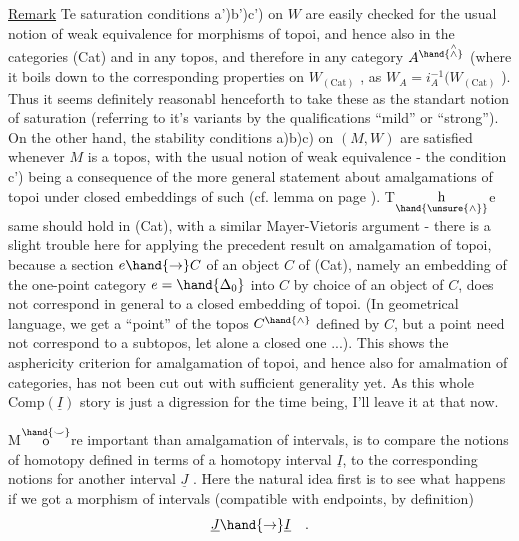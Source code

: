\uline{Remark} Te saturation conditions a')b')c') on  $W$ are easily checked
for the usual notion of weak equivalence for morphisms of topoi, and hence
also in the categories  (Cat) and in any topos, and therefore
in any category $A^{\hand{\overset{\wedge}{\wedge}}}$ (where it boils down  to the corresponding properties
on $W_{(\mathrm{Cat})}$ , as $W_A = i_A^{-1}(W_{(\mathrm{Cat})}$ ). Thus it seems definitely reasonabl
henceforth to take these as the standart notion of saturation (referring 
to it's variants by the qualifications ``mild'' or ``strong''). On the other
hand, the stability conditions a)b)c) on $(M,W)$ are satisfied whenever $M$
is a topos, with the usual notion of weak equivalence - the condition
c') being a consequence of the more general  statement about amalgamations
of topoi under closed embeddings of such (cf. lemma on page \hspace{2em}). T$\underset{\hand{\unsure{\wedge}}}{\mathrm h}$e
same should hold in (Cat), with a similar Mayer-Vietoris argument -
there is a slight trouble here for applying the precedent result on
amalgamation of topoi, because a section $e \hand{\to} C$ of an  object $C$
of (Cat), namely an embedding of the one-point category $e=\hand{\Delta_0}$ into $C$ by
choice of an object of $C$, does not correspond in general to a closed
embedding of topoi. (In geometrical language, we get a ``point'' of the
topos $C^{\hand{\wedge}}$ defined by $C$, but a point need not correspond to a subtopos,
let alone a closed one ...). This shows the asphericity criterion for
amalgamation of topoi, and hence also for amalmation of categories,
has not been cut out with sufficient generality yet. As this whole
$\mathrm{Comp}(\underline{I})$ story is just a digression for the time being, I'll leave it at
that now.

M$\overset{\hand{\smile}}{\mathrm o}$re important than amalgamation of intervals, is to compare the
notions of homotopy defined in terms of a homotopy interval $\underline{I}$, to
the corresponding notions for another interval\hand{,} $\underline{J}$ . Here the natural idea
first is to see what happens if we got a morphism of intervals (compatible
with endpoints, by definition)
\[ \underline{J} \hand{\to} \underline{I} \quad . \]

